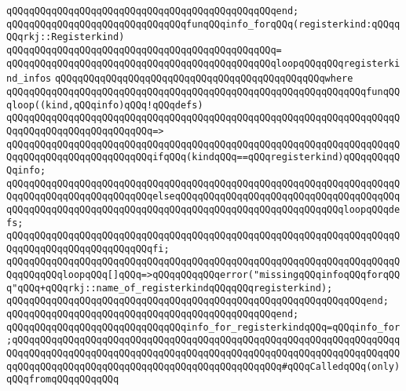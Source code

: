 \verb|qQQqqQQqqQQqqQQqqQQqqQQqqQQqqQQqqQQqqQQqqQQqqQQqend;|\newline
\newline
\verb|qQQqqQQqqQQqqQQqqQQqqQQqqQQqqQQqfunqQQqinfo_forqQQq(registerkind:qQQqqQQqrkj::Registerkind)|\newline
\verb|qQQqqQQqqQQqqQQqqQQqqQQqqQQqqQQqqQQqqQQqqQQqqQQq=|\newline
\verb|qQQqqQQqqQQqqQQqqQQqqQQqqQQqqQQqqQQqqQQqqQQqqQQqloopqQQqqQQqregisterkind_infos|\newline
\verb|qQQqqQQqqQQqqQQqqQQqqQQqqQQqqQQqqQQqqQQqqQQqqQQqwhere|\newline
\verb|qQQqqQQqqQQqqQQqqQQqqQQqqQQqqQQqqQQqqQQqqQQqqQQqqQQqqQQqqQQqqQQqfunqQQqloop((kind,qQQqinfo)qQQq!qQQqdefs)|\newline
\verb|qQQqqQQqqQQqqQQqqQQqqQQqqQQqqQQqqQQqqQQqqQQqqQQqqQQqqQQqqQQqqQQqqQQqqQQqqQQqqQQqqQQqqQQqqQQqqQQq=>|\newline
\verb|qQQqqQQqqQQqqQQqqQQqqQQqqQQqqQQqqQQqqQQqqQQqqQQqqQQqqQQqqQQqqQQqqQQqqQQqqQQqqQQqqQQqqQQqqQQqqQQqifqQQq(kindqQQq==qQQqregisterkind)qQQqqQQqqQQqinfo;|\newline
\verb|qQQqqQQqqQQqqQQqqQQqqQQqqQQqqQQqqQQqqQQqqQQqqQQqqQQqqQQqqQQqqQQqqQQqqQQqqQQqqQQqqQQqqQQqqQQqqQQqelseqQQqqQQqqQQqqQQqqQQqqQQqqQQqqQQqqQQqqQQqqQQqqQQqqQQqqQQqqQQqqQQqqQQqqQQqqQQqqQQqqQQqqQQqqQQqqQQqqQQqloopqQQqdefs;|\newline
\verb|qQQqqQQqqQQqqQQqqQQqqQQqqQQqqQQqqQQqqQQqqQQqqQQqqQQqqQQqqQQqqQQqqQQqqQQqqQQqqQQqqQQqqQQqqQQqqQQqfi;|\newline
\newline
\verb|qQQqqQQqqQQqqQQqqQQqqQQqqQQqqQQqqQQqqQQqqQQqqQQqqQQqqQQqqQQqqQQqqQQqqQQqqQQqqQQqloopqQQq[]qQQq=>qQQqqQQqqQQqerror("missingqQQqinfoqQQqforqQQq"qQQq+qQQqrkj::name_of_registerkindqQQqqQQqregisterkind);|\newline
\verb|qQQqqQQqqQQqqQQqqQQqqQQqqQQqqQQqqQQqqQQqqQQqqQQqqQQqqQQqqQQqqQQqend;|\newline
\verb|qQQqqQQqqQQqqQQqqQQqqQQqqQQqqQQqqQQqqQQqqQQqqQQqend;|\newline
\newline
\verb|qQQqqQQqqQQqqQQqqQQqqQQqqQQqqQQqinfo_for_registerkindqQQq=qQQqinfo_for;qQQqqQQqqQQqqQQqqQQqqQQqqQQqqQQqqQQqqQQqqQQqqQQqqQQqqQQqqQQqqQQqqQQqqQQqqQQqqQQqqQQqqQQqqQQqqQQqqQQqqQQqqQQqqQQqqQQqqQQqqQQqqQQqqQQqqQQqqQQqqQQqqQQqqQQqqQQqqQQqqQQqqQQqqQQqqQQqqQQqqQQqqQQq#qQQqCalledqQQq(only)qQQqfromqQQqqQQqqQQq|\newline
